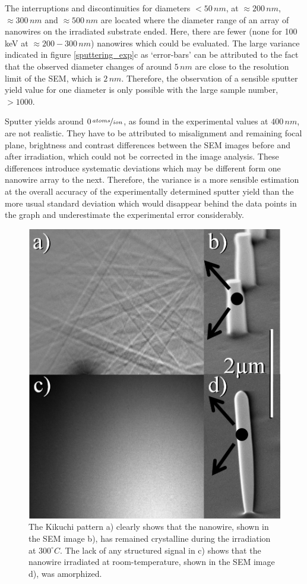 The interruptions and discontinuities for diameters $<50\,nm$, at $\approx 200\,nm$, $\approx 300\,nm$ and $\approx 500\,nm$ are located where the diameter range of an array of nanowires on the irradiated substrate ended. Here, there are fewer (none for 100\,keV at $\approx 200 - 300\,nm$) nanowires which could be evaluated. The large variance indicated in figure \ref{sputtering_exp}c as `error-bars' can be attributed to the fact that the observed diameter changes of around $5\,nm$ are close to the resolution limit of the SEM, which is $2\,nm$. Therefore, the observation of a sensible sputter yield value for one diameter is only possible with the large sample number, $>1000$.

Sputter yields around $0\,\nicefrac{atoms}{ion}$, as found in the experimental values at $400\,nm$, are not realistic. They have to be attributed to misalignment and remaining focal plane, brightness and contrast differences between the SEM images before and after irradiation, which could not be corrected in the image analysis. These differences introduce systematic deviations which may be different form one nanowire array to the next. Therefore, the variance is a more sensible estimation at the overall accuracy of the experimentally determined sputter yield than the more usual standard deviation which would disappear behind the data points in the graph and underestimate the experimental error considerably.

\begin{figure}
	\centering
		\includegraphics[width=.3\textwidth]{images/EBSD.jpg}
	\caption{The Kikuchi pattern a) clearly shows that the nanowire, shown in the SEM image b), has remained crystalline during the irradiation at $300^\circ C$. The lack of any structured signal in c) shows that the nanowire irradiated at room-temperature, shown in the SEM image d), was amorphized.} 
	\label{EBSD}
\end{figure}

